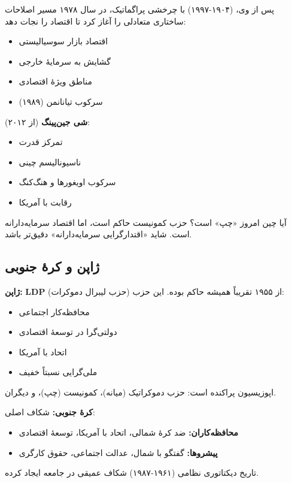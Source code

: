 پس از وی،  (۱۹۰۴-۱۹۹۷) با چرخشی پراگماتیک، در سال ۱۹۷۸ مسیر اصلاحات ساختاری متعادلی را آغاز کرد تا اقتصاد را نجات دهد:
\begin{itemize}
    \item اقتصاد بازار سوسیالیستی
    \item گشایش به سرمایهٔ خارجی
    \item مناطق ویژهٔ اقتصادی
    \item سرکوب تیانانمن (۱۹۸۹)
\end{itemize}

\textbf{شی جین‌پینگ} (از ۲۰۱۲):
\begin{itemize}
    \item تمرکز قدرت
    \item ناسیونالیسم چینی
    \item سرکوب اویغورها و هنگ‌کنگ
    \item رقابت با آمریکا
\end{itemize}

آیا چین امروز «چپ» است؟ حزب کمونیست حاکم است، اما اقتصاد سرمایه‌دارانه است. شاید «اقتدارگرایی سرمایه‌دارانه» دقیق‌تر باشد.


\subsection{ژاپن و کرهٔ جنوبی}


\textbf{ژاپن:}
\textbf{LDP} (حزب لیبرال دموکرات) از ۱۹۵۵ تقریباً همیشه حاکم بوده. این حزب:
\begin{itemize}
    \item محافظه‌کار اجتماعی
    \item دولتی‌گرا در توسعهٔ اقتصادی
    \item اتحاد با آمریکا
    \item ملی‌گرایی نسبتاً خفیف
\end{itemize}

اپوزیسیون پراکنده است: حزب دموکراتیک (میانه)، کمونیست (چپ)، و دیگران.

\textbf{کرهٔ جنوبی:}
شکاف اصلی:
\begin{itemize}
    \item \textbf{محافظه‌کاران:} ضد کرهٔ شمالی، اتحاد با آمریکا، توسعهٔ اقتصادی
    \item \textbf{پیشرو‌ها:} گفتگو با شمال، عدالت اجتماعی، حقوق کارگری
\end{itemize}

تاریخ دیکتاتوری نظامی (۱۹۶۱-۱۹۸۷) شکاف عمیقی در جامعه ایجاد کرده.


